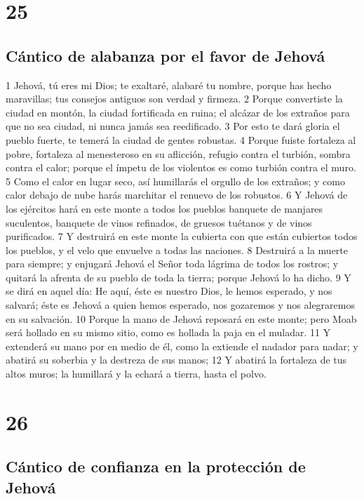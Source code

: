 \chapter{25}

\section*{Cántico de alabanza por el favor de Jehová}

1 Jehová, tú eres mi Dios; te exaltaré, alabaré tu nombre, porque has hecho maravillas; tus consejos antiguos son verdad y firmeza.
2 Porque convertiste la ciudad en montón, la ciudad fortificada en ruina; el alcázar de los extraños para que no sea ciudad, ni nunca jamás sea reedificado.
3 Por esto te dará gloria el pueblo fuerte, te temerá la ciudad de gentes robustas. 
4 Porque fuiste fortaleza al pobre, fortaleza al menesteroso en su aflicción, refugio contra el turbión, sombra contra el calor; porque el ímpetu de los violentos es como turbión contra el muro.
5 Como el calor en lugar seco, así humillarás el orgullo de los extraños; y como calor debajo de nube harás marchitar el renuevo de los robustos.
6 Y Jehová de los ejércitos hará en este monte a todos los pueblos banquete de manjares suculentos, banquete de vinos refinados, de gruesos tuétanos y de vinos purificados.
7 Y destruirá en este monte la cubierta con que están cubiertos todos los pueblos, y el velo que envuelve a todas las naciones.
8 Destruirá a la muerte para siempre; y enjugará Jehová el Señor toda lágrima de todos los rostros; y quitará la afrenta de su pueblo de toda la tierra; porque Jehová lo ha dicho.
9 Y se dirá en aquel día: He aquí, éste es nuestro Dios, le hemos esperado, y nos salvará; éste es Jehová a quien hemos esperado, nos gozaremos y nos alegraremos en su salvación.
10 Porque la mano de Jehová reposará en este monte; pero Moab será hollado en su mismo sitio, como es hollada la paja en el muladar.
11 Y extenderá su mano por en medio de él, como la extiende el nadador para nadar; y abatirá su soberbia y la destreza de sus manos;
12 Y abatirá la fortaleza de tus altos muros; la humillará y la echará a tierra, hasta el polvo.

\chapter{26}

\section*{Cántico de confianza en la protección de Jehová}

